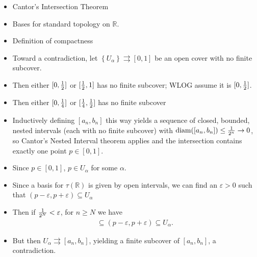 \begin{solution}

\envlist

\begin{concept}

\envlist

\begin{itemize}
\tightlist
\item
  Cantor's Intersection Theorem
\item
  Bases for standard topology on \({\mathbb{R}}\).
\item
  Definition of compactness
\end{itemize}

\end{concept}

\begin{itemize}
\tightlist
\item
  Toward a contradiction, let
  \(\left\{{U_\alpha}\right\} \rightrightarrows[0, 1]\) be an open cover
  with no finite subcover.
\item
  Then either \([0, {1\over 2}]\) or \([{1\over 2}, 1]\) has no finite
  subcover; WLOG assume it is \([0, {1\over 2}]\).
\item
  Then either \([0, {1\over 4}]\) or \([{1\over 4}, {1\over 2}]\) has no
  finite subcover
\item
  Inductively defining \([a_n, b_n]\) this way yields a sequence of
  closed, bounded, nested intervals (each with no finite subcover) with
  \({\operatorname{diam}}([a_n, b_n]) \leq {1 \over 2^n} \to 0\), so
  Cantor's Nested Interval theorem applies and the intersection contains
  exactly one point \(p \in [0, 1]\).
\item
  Since \(p\in [0, 1]\), \(p\in U_\alpha\) for some \(\alpha\).
\item
  Since a basis for \(\tau({\mathbb{R}})\) is given by open intervals,
  we can find an \(\varepsilon>0\) such that
  \((p-\varepsilon, p+\varepsilon) \subseteq U_\alpha\)
\item
  Then if \({1\over 2^N} < \varepsilon\), for \(n\geq N\) we have
  \begin{align*}[a_n, b_n] \subseteq (p-\varepsilon, p+\varepsilon) \subseteq U_\alpha.\end{align*}
\item
  But then \(U_\alpha \rightrightarrows[a_n, b_n]\), yielding a finite
  subcover of \([a_n, b_n]\), a contradiction.
\end{itemize}

\end{solution}

